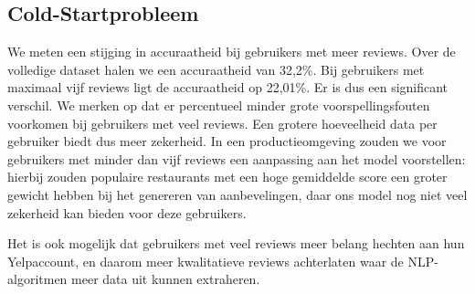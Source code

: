 

\subsection{Cold-Startprobleem}
We meten een stijging in accuraatheid bij gebruikers met meer reviews. Over de volledige dataset halen we een accuraatheid van 32,2\%. Bij gebruikers met maximaal vijf reviews ligt de accuraatheid op 22,01\%. Er is dus een significant verschil. We merken op dat er percentueel minder grote voorspellingsfouten voorkomen bij gebruikers met veel reviews. Een grotere hoeveelheid data per gebruiker biedt dus meer zekerheid. In een productieomgeving zouden we voor gebruikers met minder dan vijf reviews een aanpassing aan het model voorstellen: hierbij zouden populaire restaurants met een hoge gemiddelde score een groter gewicht hebben bij het genereren van aanbevelingen, daar ons model nog niet veel zekerheid kan bieden voor deze gebruikers.

Het is ook mogelijk dat gebruikers met veel reviews meer belang hechten aan hun Yelpaccount, en daarom meer kwalitatieve reviews achterlaten waar de NLP-algoritmen meer data uit kunnen extraheren.



